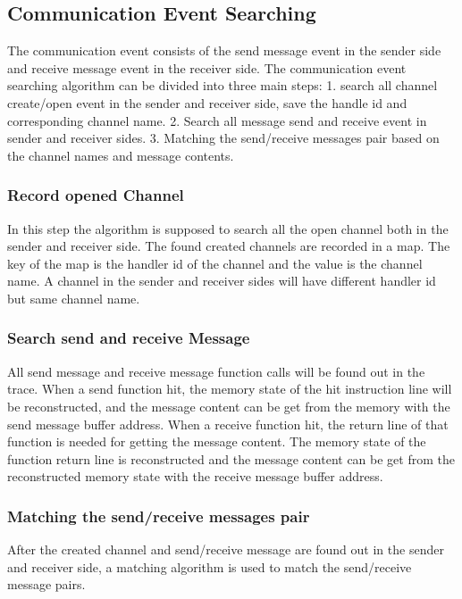 \documentclass[paper=a4, fontsize=11pt]{scrartcl}
\numberwithin{equation}{section}		%
\numberwithin{figure}{section}			%
\numberwithin{table}{section}				%
\begin{document}
\subsection{Communication Event Searching}
The communication event consists of the send message event in the sender side and receive message event in the receiver side. The communication event searching algorithm can be divided into three main steps: 1. search all channel create/open event in the sender and receiver side, save the handle id and corresponding channel name. 2. Search all message send and receive event in sender and receiver sides. 3. Matching the send/receive messages pair based on the channel names and message contents.
\subsubsection{Record opened Channel}
In this step the algorithm is supposed to search all the open channel both in the sender and receiver side. The found created channels are recorded in a map. The key of the map is the handler id of the channel and the value is the channel name. A channel in the sender and receiver sides will have different handler id but same channel name.
\subsubsection{Search send and receive Message}
All send message and receive message function calls will be found out in the trace. When a send function hit, the memory state of the hit instruction line will be reconstructed, and the message content can be get from the memory with the send message buffer address. When a receive function hit, the return line of that function is needed for getting the message content. The memory state of the function return line is reconstructed and the message content can be get  from the reconstructed memory state with the receive message buffer address.
\subsubsection{Matching the send/receive messages pair}
After the created channel and send/receive message are found out in the sender and receiver side, a matching algorithm is used to match the send/receive message pairs.
\end{document}
